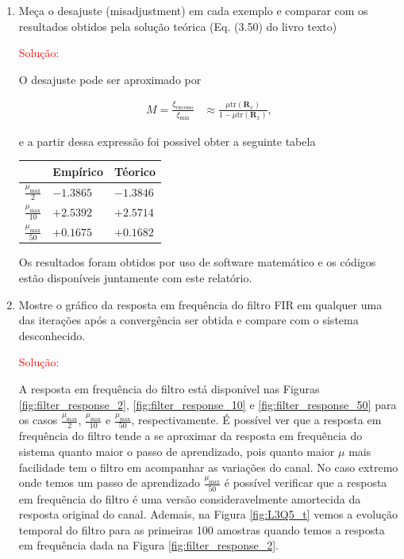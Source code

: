 \begin{enumerate}
        \clearpage


        \item Meça o desajuste (misadjustment) em cada exemplo e comparar com os resultados obtidos pela solução teórica (Eq. (3.50) do livro texto)					

        \textcolor{red}{Solução:}

        O desajuste pode ser aproximado por

        \begin{align}
            M = \frac{\xi_{\text{excesso}}}{\xi_{\text{min}}} &\approx \frac{\mu \text{tr}(\mathbf{R}_{x})}{1 - \mu \text{tr}(\mathbf{R}_{x})},
        \end{align}

        e a partir dessa expressão foi possivel obter a seguinte tabela

        \begin{table}[!htp]
            \centering
            \begin{tabular}{|l|l|l|}
                \hline
                & Empírico & Téorico \\ \hline
                $\frac{\mu_{\text{max}}}{2}$  & $ -1.3865 $ &  $ -1.3846 $ \\ \hline
                $\frac{\mu_{\text{max}}}{10}$ & $ +2.5392 $ & $ +2.5714 $ \\ \hline
                $\frac{\mu_{\text{max}}}{50}$ & $ +0.1675 $ & $ +0.1682 $ \\ \hline
            \end{tabular}
        \end{table}

        Os resultados foram obtidos por uso de software matemático e os códigos estão disponíveis juntamente com este relatório.

    \item Mostre o gráﬁco da resposta em frequência do ﬁltro FIR em qualquer uma das iterações após a convergência ser obtida e compare com o sistema desconhecido.

        \textcolor{red}{Solução:}

        A resposta em frequência do filtro está disponível nas Figuras \ref{fig:filter_response_2}, \ref{fig:filter_response_10} e \ref{fig:filter_response_50} para os casos $\frac{\mu_{\text{max}}}{2}$, $\frac{\mu_{\text{max}}}{10}$ e $\frac{\mu_{\text{max}}}{50}$, respectivamente. 
        É possível ver que a resposta em frequência do filtro tende a se aproximar da resposta em frequência do sistema quanto maior o passo de aprendizado, pois quanto maior $\mu$ mais facilidade tem o filtro em acompanhar as variações do canal. 
        No caso extremo onde temos um passo de aprendizado $\frac{\mu_{\text{max}}}{50}$ é possível verificar que a resposta em frequência do filtro é uma versão consideravelmente amortecida da resposta original do canal. 
        Ademais, na Figura \ref{fig:L3Q5_t} vemos a evolução temporal do filtro para as primeiras 100 amostras quando temos a resposta em frequência dada na Figura \ref{fig:filter_response_2}.

\end{enumerate}




